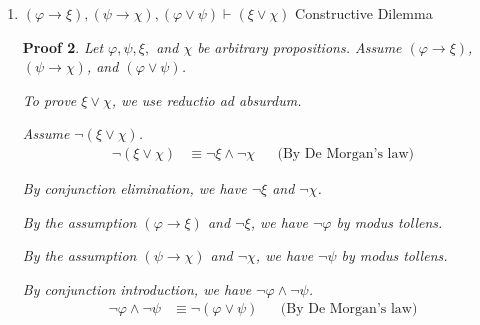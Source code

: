 \documentclass[12pt]{article}
\newcommand{\F}{\bot}
\theoremstyle{proofstyle}
\newtheorem*{proof*}{Proof}
\let\oldquote\quote
\let\oldendquote\endquote
\renewenvironment{quote}
    {\oldquote\setlength{\parskip}{0.2em}}
    {\oldendquote}
\begin{document}
\begin{enumerate}[left=0pt, itemsep=2em, parsep=1em]
\begin{enumerate}[label=(\alph*), itemsep=1.5em, leftmargin=2em]
\begin{proof*}
    By conjunction introduction, we have $(\varphi \lor \psi) \land \neg \varphi$:
     \begin{align*}
        (\varphi \lor \psi) \land \neg \varphi &\equiv \neg \varphi \land (\varphi \lor \psi)  && \text{(By Commutativity)} \\
        &\equiv (\neg \varphi \land \varphi) \lor (\neg \varphi \land \psi) && \text{(By Distributivity)} \\
        &\equiv \F \lor (\neg \varphi \land \psi) && \text{(By Complement)} \\
        &\equiv \neg \varphi \land \psi && \text{(By Identity)}\\
        &\equiv \psi \land \neg \varphi && \text{(By Commutativity)}
    \end{align*}
    By conjunction elimination, we have $\psi$. \\
    Therefore, $\psi$ holds. \qed
\end{proof*}

\item $(\varphi \to \xi), (\psi \to \chi), (\varphi \vee \psi) \vdash (\xi \vee \chi)$ \hfill Constructive Dilemma

\begin{proof*}
    Let $\varphi, \psi, \xi,$ and $\chi$ be arbitrary propositions. Assume $(\varphi \to \xi)$, $(\psi \to \chi)$, and $(\varphi \vee \psi)$.
    
    To prove $\xi \vee \chi$, we use reductio ad absurdum.
    
    \begin{quote}
    Assume $\neg(\xi \vee \chi)$.
    \begin{align*}
        \neg(\xi \vee \chi) &\equiv \neg\xi \wedge \neg\chi && \text{(By De Morgan's law)}
    \end{align*}
    
    By conjunction elimination, we have $\neg\xi$ and $\neg\chi$.
    
    By the assumption $(\varphi \to \xi)$ and $\neg\xi$, we have $\neg\varphi$ by modus tollens.
    
    By the assumption $(\psi \to \chi)$ and $\neg\chi$, we have $\neg\psi$ by modus tollens.
    
    By conjunction introduction, we have $\neg\varphi \wedge \neg\psi$.
    \begin{align*}
        \neg\varphi \wedge \neg\psi &\equiv \neg(\varphi \vee \psi) && \text{(By De Morgan's law)}
    \end{align*}
    

\end{quote}
\end{proof*}
\end{enumerate}
\end{enumerate}
\end{document}
